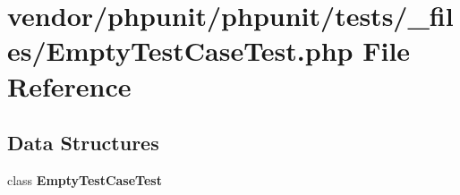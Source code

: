 \section{vendor/phpunit/phpunit/tests/\+\_\+files/\+Empty\+Test\+Case\+Test.php File Reference}
\label{_empty_test_case_test_8php}
\subsection*{Data Structures}
\begin{DoxyCompactItemize}
\item 
class {\bf Empty\+Test\+Case\+Test}
\end{DoxyCompactItemize}
